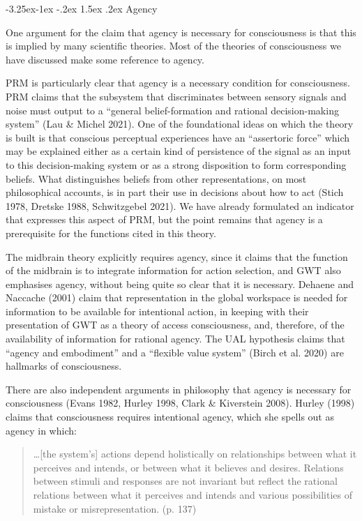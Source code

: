 \documentclass[12pt]{article}
\makeatletter
\newenvironment{myquote}
  {\begin{quote}\leftskip=1cm\rightskip=1cm}
  {\end{quote}}
\newcounter{subsubsubsection}[subsubsection]
\def\subsubsubsection{\@startsection{subsubsubsection}{4}{\z@}%
                                     {-3.25ex\@plus -1ex \@minus -.2ex}%
                                     {1.5ex \@plus .2ex}%
                                     {\normalfont\normalsize\itshape}}
\makeatother
\begin{document}
{}
\subsubsubsection{Agency}

One argument for the claim that agency is necessary for consciousness is that this is implied by many scientific theories. Most of the theories of consciousness we have discussed make some reference to agency.

PRM is particularly clear that agency is a necessary condition for consciousness. PRM claims that the subsystem that discriminates between sensory signals and noise must output to a ``general belief-formation and rational decision-making system'' (Lau \& Michel 2021). One of the foundational ideas on which the theory is built is that conscious perceptual experiences have an ``assertoric force'' which may be explained either as a certain kind of persistence of the signal as an input to this decision-making system or as a strong disposition to form corresponding beliefs. What distinguishes beliefs from other representations, on most philosophical accounts, is in part their use in decisions about how to act (Stich 1978, Dretske 1988, Schwitzgebel 2021). We have already formulated an indicator that expresses this aspect of PRM, but the point remains that agency is a prerequisite for the functions cited in this theory.

The midbrain theory explicitly requires agency, since it claims that the function of the midbrain is to integrate information for action selection, and GWT also emphasises agency, without being quite so clear that it is necessary. Dehaene and Naccache (2001) claim that representation in the global workspace is needed for information to be available for intentional action, in keeping with their presentation of GWT as a theory of access consciousness, and, therefore, of the availability of information for rational agency. The UAL hypothesis claims that ``agency and embodiment'' and a ``flexible value system'' (Birch et al. 2020) are hallmarks of consciousness.

There are also independent arguments in philosophy that agency is necessary for consciousness (Evans 1982, Hurley 1998, Clark \& Kiverstein 2008). Hurley (1998) claims that consciousness requires intentional agency, which she spells out as agency in which:

\begin{myquote}
…[the system’s] actions depend holistically on relationships between what it perceives and intends, or between what it believes and desires. Relations between stimuli and responses are not invariant but reflect the rational relations between what it perceives and intends and various possibilities of mistake or misrepresentation. (p. 137)
\end{myquote}
\end{document}
